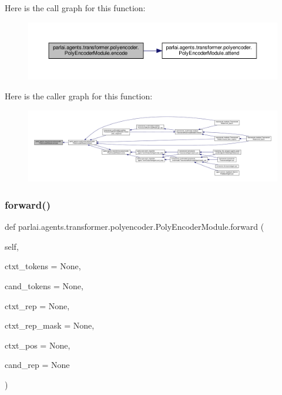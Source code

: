 Here is the call graph for this function\+:
\nopagebreak
\begin{figure}[H]
\begin{center}
\leavevmode
\includegraphics[width=350pt]{classparlai_1_1agents_1_1transformer_1_1polyencoder_1_1PolyEncoderModule_a54ca3cb24e2a0fbbfa7b3f145c7558ed_cgraph}
\end{center}
\end{figure}
Here is the caller graph for this function\+:
\nopagebreak
\begin{figure}[H]
\begin{center}
\leavevmode
\includegraphics[width=350pt]{classparlai_1_1agents_1_1transformer_1_1polyencoder_1_1PolyEncoderModule_a54ca3cb24e2a0fbbfa7b3f145c7558ed_icgraph}
\end{center}
\end{figure}
\mbox{\label{classparlai_1_1agents_1_1transformer_1_1polyencoder_1_1PolyEncoderModule_a9e769210d947e88dc3e4555583b9c82e}} 
\subsubsection{\texorpdfstring{forward()}{forward()}}
{\footnotesize\ttfamily def parlai.\+agents.\+transformer.\+polyencoder.\+Poly\+Encoder\+Module.\+forward (\begin{DoxyParamCaption}\item[{}]{self,  }\item[{}]{ctxt\+\_\+tokens = {\ttfamily None},  }\item[{}]{cand\+\_\+tokens = {\ttfamily None},  }\item[{}]{ctxt\+\_\+rep = {\ttfamily None},  }\item[{}]{ctxt\+\_\+rep\+\_\+mask = {\ttfamily None},  }\item[{}]{ctxt\+\_\+pos = {\ttfamily None},  }\item[{}]{cand\+\_\+rep = {\ttfamily None} }\end{DoxyParamCaption})}

